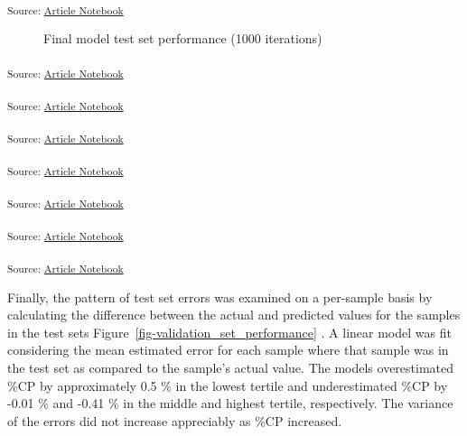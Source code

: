 \documentclass[
]{agujournal2019}
\begin{document}
\textsubscript{Source:
\href{https://rvcrawford.github.io/glowing-system/index.qmd.html}{Article
Notebook}}

\label{cell-fig-final-metric-boxplot}
\begin{figure}[H]


\caption{\label{fig-final-metric-boxplot}Final model test set
performance (1000 iterations)}

\end{figure}%

\textsubscript{Source:
\href{https://rvcrawford.github.io/glowing-system/index.qmd.html}{Article
Notebook}}

\textsubscript{Source:
\href{https://rvcrawford.github.io/glowing-system/index.qmd.html}{Article
Notebook}}

\textsubscript{Source:
\href{https://rvcrawford.github.io/glowing-system/index.qmd.html}{Article
Notebook}}

\textsubscript{Source:
\href{https://rvcrawford.github.io/glowing-system/index.qmd.html}{Article
Notebook}}

\textsubscript{Source:
\href{https://rvcrawford.github.io/glowing-system/index.qmd.html}{Article
Notebook}}

\textsubscript{Source:
\href{https://rvcrawford.github.io/glowing-system/index.qmd.html}{Article
Notebook}}

\textsubscript{Source:
\href{https://rvcrawford.github.io/glowing-system/index.qmd.html}{Article
Notebook}}

Finally, the pattern of test set errors was examined on a per-sample
basis by calculating the difference between the actual and predicted
values for the samples in the test sets
Figure~\ref{fig-validation_set_performance} . A linear model was fit
considering the mean estimated error for each sample where that sample
was in the test set as compared to the sample's actual value. The models
overestimated \%CP by approximately 0.5 \% in the lowest tertile and
underestimated \%CP by -0.01 \% and -0.41 \% in the middle and highest
tertile, respectively. The variance of the errors did not increase
appreciably as \%CP increased.
\end{document}
